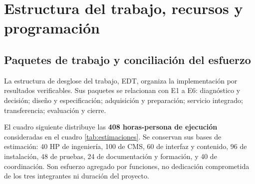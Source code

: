 \section{Estructura del trabajo, recursos y programación}
\label{sec:int_edt}
\subsection{Paquetes de trabajo y conciliación del esfuerzo}
La estructura de desglose del trabajo, EDT, organiza la implementación por resultados verificables. Sus paquetes se relacionan con E1 a E6: diagnóstico y decisión; diseño y especificación; adquisición y preparación; servicio integrado; transferencia; evaluación y cierre.

El cuadro siguiente distribuye las \textbf{408 horas-persona de ejecución} consideradas en el cuadro \ref{tab:estimaciones}. Se conservan sus bases de estimación: 40 HP de ingeniería, 100 de CMS, 60 de interfaz y contenido, 96 de instalación, 48 de pruebas, 24 de documentación y formación, y 40 de coordinación. Son esfuerzo agregado por funciones, no dedicación comprometida de los tres integrantes ni duración del proyecto.


